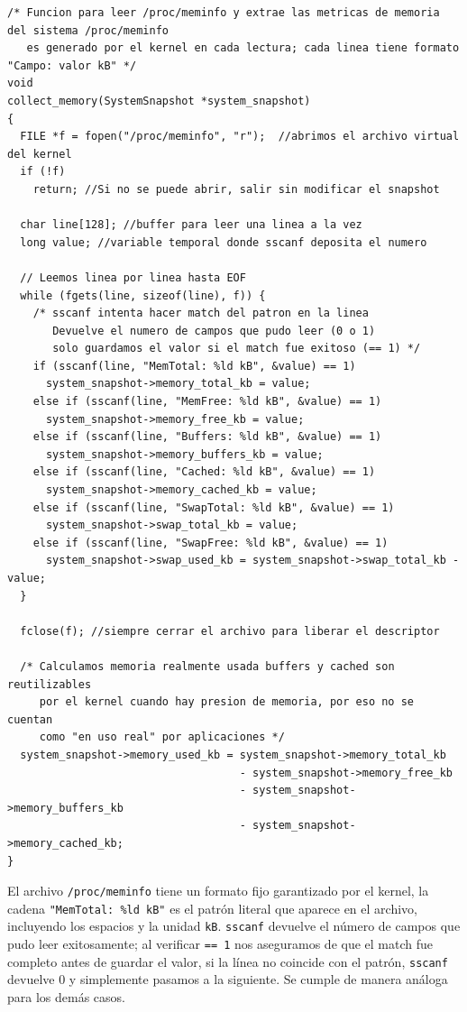 \documentclass[12pt,letterpaper]{article}
\begin{document}
\begin{lstlisting}[style=modernc, caption={\texttt{monitor.c} --- collect\_memory() (líneas 18--47)}]
/* Funcion para leer /proc/meminfo y extrae las metricas de memoria del sistema /proc/meminfo
   es generado por el kernel en cada lectura; cada linea tiene formato "Campo: valor kB" */
void
collect_memory(SystemSnapshot *system_snapshot)
{
  FILE *f = fopen("/proc/meminfo", "r");  //abrimos el archivo virtual del kernel
  if (!f)
    return; //Si no se puede abrir, salir sin modificar el snapshot

  char line[128]; //buffer para leer una linea a la vez
  long value; //variable temporal donde sscanf deposita el numero

  // Leemos linea por linea hasta EOF
  while (fgets(line, sizeof(line), f)) {
    /* sscanf intenta hacer match del patron en la linea
       Devuelve el numero de campos que pudo leer (0 o 1)
       solo guardamos el valor si el match fue exitoso (== 1) */
    if (sscanf(line, "MemTotal: %ld kB", &value) == 1)
      system_snapshot->memory_total_kb = value;
    else if (sscanf(line, "MemFree: %ld kB", &value) == 1)
      system_snapshot->memory_free_kb = value;
    else if (sscanf(line, "Buffers: %ld kB", &value) == 1)
      system_snapshot->memory_buffers_kb = value;
    else if (sscanf(line, "Cached: %ld kB", &value) == 1)
      system_snapshot->memory_cached_kb = value;
    else if (sscanf(line, "SwapTotal: %ld kB", &value) == 1)
      system_snapshot->swap_total_kb = value;
    else if (sscanf(line, "SwapFree: %ld kB", &value) == 1)
      system_snapshot->swap_used_kb = system_snapshot->swap_total_kb - value;
  }
  
  fclose(f); //siempre cerrar el archivo para liberar el descriptor

  /* Calculamos memoria realmente usada buffers y cached son reutilizables
     por el kernel cuando hay presion de memoria, por eso no se cuentan
     como "en uso real" por aplicaciones */
  system_snapshot->memory_used_kb = system_snapshot->memory_total_kb
                                    - system_snapshot->memory_free_kb
                                    - system_snapshot->memory_buffers_kb
                                    - system_snapshot->memory_cached_kb;
}
\end{lstlisting}

\bigskip

El archivo \texttt{/proc/meminfo} tiene un formato fijo garantizado por el kernel, la cadena \texttt{"MemTotal: \%ld kB"} es el patrón literal que aparece en el archivo, incluyendo los espacios y la unidad \texttt{kB}.
\texttt{sscanf} devuelve el número de campos que pudo leer exitosamente; al verificar \texttt{== 1} nos aseguramos de que el match fue completo antes de guardar el valor, si la línea no coincide con el patrón, \texttt{sscanf} devuelve 0 y simplemente pasamos a la siguiente. Se cumple de manera análoga para los demás casos.
\end{document}

